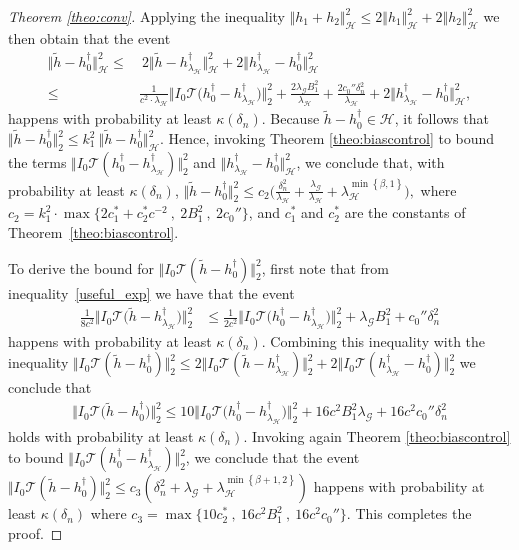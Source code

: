\documentclass[twoside,11pt]{article}
\newcommand{\mc}{\mathcal}
\begin{document}
\begin{proof}[Theorem \ref{theo:conv}]
       Applying the inequality $\Vert h_1+h_2\Vert_{\mc{H}}^2\le 2\Vert h_1\Vert_{\mc{H}}^2+2\Vert h_2\Vert_{\mc{H}}^2$ we then obtain that the event
        \begin{align*}
            \big\Vert \tilde h-h_0^\dag\big\Vert_{\mc{H}}^2
            \le& \:2\big\Vert \tilde h-h_{\lambda_\mc{H}}^\dag\big\Vert_{\mc{H}}^2+2\big\Vert h_{\lambda_\mc{H}}^\dag-h_0^\dag\big\Vert_{\mc{H}}^2\\
            \le& \frac{1}{c^2\cdot\lambda_{\mc{H}}}\big\Vert I_0\mc{T}\big(h_0^\dag-h_{\lambda_\mc{H}}^\dag\big)\big\Vert_2^2+\frac{2\lambda_{\mc{G}}B_1^2}{\lambda_{\mc{H}}}+\frac{2c_0''\delta_n^2}{\lambda_{\mc{H}}}+2\big\Vert h_{\lambda_\mc{H}}^\dag-h_0^\dag\big\Vert_{\mc{H}}^2,
        \end{align*}
        happens with probability at least $\kappa(\delta_n)$.
       Because $\tilde h-h_0^\dag\in\mc{H}$, it follows that $ \Vert \tilde h-h_0^\dag\Vert_2^2\le k_1^2 \: \Vert \tilde h-h_0^\dag\Vert_{\mc{H}}^2$. Hence, invoking Theorem \ref{theo:biascontrol} to bound the terms $\Vert I_0\mc{T}(h_0^\dag-h_{\lambda_{\mc{H}}}^\dag)\Vert_2^2$ and $\Vert h_{\lambda_{\mc{H}}}^\dag-h_0^\dag\Vert_{\mc{H}}^2$, we conclude that, with probability at least $\kappa(\delta_n)$,
  $ \Vert \tilde h-h_0^\dag\Vert_2^2\le c_2\big(\frac{\delta_n^2}{\lambda_{\mc{H}}}+\frac{\lambda_{\mc{G}}}{\lambda_{\mc{H}}}+\lambda_{\mc{H}}^{\min\left\{\beta,1\right\}}\big),
    $ where $ c_2=k_1^2\cdot\max\{2c_1^*+c_2^*c^{-2}\:,\: 2B_1^2\:,\:2c_0''\}$, and $c_1^*$ and $c_2^*$ are the constants of Theorem~\ref{theo:biascontrol}.
    
   To derive the bound for $\Vert I_0\mc{T}(\tilde h-h_0^\dag)\Vert_2^2$, first note that from inequality~\eqref{useful_exp} we have that the event
\begin{align*}
             \frac{1}{8c^2}\big\Vert I_0\mc{T}\big(\tilde h-h_{\lambda_{\mc{H}}}^\dag\big)\big\Vert_2^2&\le  \frac{1}{2c^2}\big\Vert I_0\mc{T}\big(h_0^\dag-h_{\lambda_{\mc{H}}}^\dag\big)\big\Vert_2^2+\lambda_{\mc{G}}B_1^2+c_0''\delta_n^2
        \end{align*}
        happens with probability at least $\kappa(\delta_n)$. Combining this inequality with the inequality $ \Vert I_0\mc{T}(\tilde h-h_0^\dag)\Vert_2^2\le 2\Vert I_0\mc{T}(\tilde h-h_{\lambda_{\mc{H}}}^\dag)\Vert_2^2+2\Vert I_0\mc{T}(h_{\lambda_{\mc{H}}}^\dag-h_0^\dag)\Vert_2^2$  we conclude that
\begin{align*}
            \big\Vert I_0\mc{T}\big(\tilde h-h_0^\dag\big)\big\Vert_2^2\le 10\big\Vert I_0\mc{T}\big(h_0^\dag-h_{\lambda_{\mc{H}}}^\dag\big)\big\Vert_2^2+16c^2B_1^2\lambda_{\mc{G}}+16c^2c_0''\delta_n^2
         \end{align*}
         holds with probability at least $\kappa(\delta_n)$. Invoking again Theorem \ref{theo:biascontrol} to bound $\Vert I_0\mc{T}(h_0^\dag-h_{\lambda_{\mc{H}}}^\dag)\Vert_2^2$, we conclude that the event 
$ \Vert I_0\mc{T}(\tilde h-h_0^\dag)\Vert_2^2\le c_3\left(\delta_n^2+\lambda_{\mc{G}}+\lambda_{\mc{H}}^{\min\left\{\beta+1,2\right\}}\right) $ happens with probability at least $\kappa(\delta_n)$ 
    where $c_3=\max\{10 c_2^*\:,\:16c^2B_1^2\:,\:16c^2c_0''\}$. This completes the proof.
\end{proof}
\end{document}
